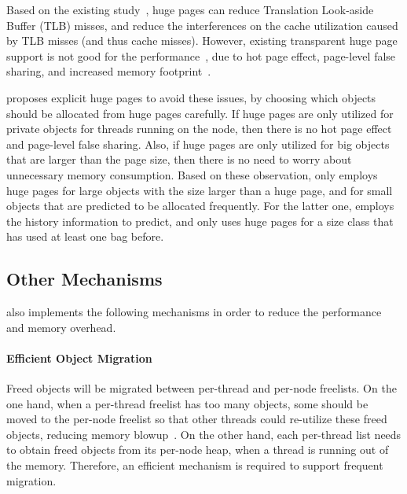  Based on the existing study~\cite{hugepages}, huge pages can reduce Translation Look-aside Buffer (TLB) misses, and  reduce the interferences on the cache utilization caused by TLB misses (and thus cache misses). However, existing  transparent huge page support is not good for the performance~\cite{Gaud:2014:LPM:2643634.2643659, DBLP:conf/asplos/PanwarBG19}, due to hot page effect, page-level false sharing, and increased memory footprint~\cite{DBLP:conf/asplos/MaasAIJMR20}.
 
\NA{} proposes explicit huge pages to avoid these issues, by choosing which objects should be allocated from huge pages carefully. If huge pages are only utilized for private objects for threads running on the node, then there is no hot page effect and page-level false sharing. Also, if huge pages are only utilized for big objects that are larger than the page size, then there is no need to worry about unnecessary memory consumption. Based on these observation,  \NM{} only employs huge pages for large objects with the size larger than a huge page, and for small objects that are predicted to be allocated frequently. For the latter one, \NM{} employs the history information to predict, and only uses huge pages for a size class that has used at least one bag before. 


\subsection{Other Mechanisms}
\label{sec: others}

\NM{} also implements the following mechanisms in order to reduce the performance and memory overhead. 

\paragraph{Efficient Object Migration} Freed objects will be migrated between per-thread and per-node freelists. On the one hand, when a per-thread freelist has too many objects, some should be moved to the per-node freelist so that other threads could re-utilize these freed objects, reducing memory blowup~\cite{Hoard}. On the other hand, each per-thread list needs to obtain freed objects from its per-node heap, when a thread is running out of the memory. Therefore, an efficient mechanism is required to support frequent migration. 

